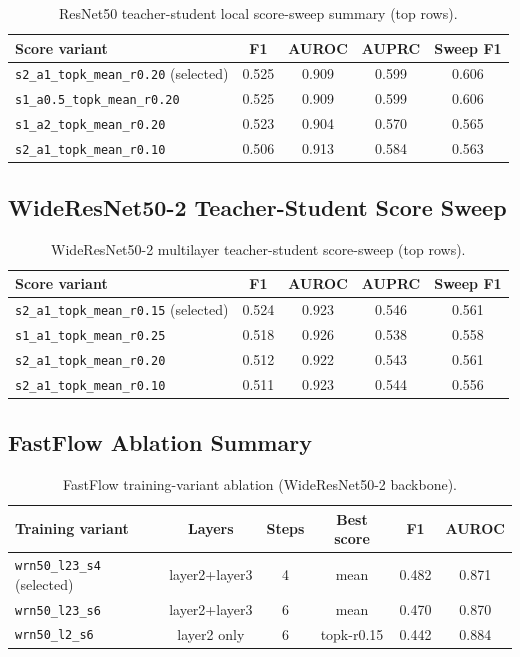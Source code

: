 \documentclass[11pt]{article}
\begin{document}
\begin{table}[H]
\centering
\caption{ResNet50 teacher-student local score-sweep summary (top rows).}
\label{tab:appendix_ts_resnet50}
\begin{tabular}{lcccc}
\toprule
Score variant & F1 & AUROC & AUPRC & Sweep F1 \\
\midrule
\texttt{s2\_a1\_topk\_mean\_r0.20} (selected) & 0.525 & 0.909 & 0.599 & 0.606 \\
\texttt{s1\_a0.5\_topk\_mean\_r0.20}           & 0.525 & 0.909 & 0.599 & 0.606 \\
\texttt{s1\_a2\_topk\_mean\_r0.20}             & 0.523 & 0.904 & 0.570 & 0.565 \\
\texttt{s2\_a1\_topk\_mean\_r0.10}             & 0.506 & 0.913 & 0.584 & 0.563 \\
\bottomrule
\end{tabular}
\end{table}

\subsection{WideResNet50-2 Teacher-Student Score Sweep}

\begin{table}[H]
\centering
\caption{WideResNet50-2 multilayer teacher-student score-sweep (top rows).}
\label{tab:appendix_ts_wrn}
\begin{tabular}{lcccc}
\toprule
Score variant & F1 & AUROC & AUPRC & Sweep F1 \\
\midrule
\texttt{s2\_a1\_topk\_mean\_r0.15} (selected) & 0.524 & 0.923 & 0.546 & 0.561 \\
\texttt{s1\_a1\_topk\_mean\_r0.25}             & 0.518 & 0.926 & 0.538 & 0.558 \\
\texttt{s2\_a1\_topk\_mean\_r0.20}             & 0.512 & 0.922 & 0.543 & 0.561 \\
\texttt{s2\_a1\_topk\_mean\_r0.10}             & 0.511 & 0.923 & 0.544 & 0.556 \\
\bottomrule
\end{tabular}
\end{table}

\subsection{FastFlow Ablation Summary}

\begin{table}[H]
\centering
\caption{FastFlow training-variant ablation (WideResNet50-2 backbone).}
\label{tab:appendix_fastflow}
\begin{tabular}{lccccc}
\toprule
Training variant & Layers & Steps & Best score & F1 & AUROC \\
\midrule
\texttt{wrn50\_l23\_s4} (selected) & layer2+layer3 & 4 & mean       & 0.482 & 0.871 \\
\texttt{wrn50\_l23\_s6}            & layer2+layer3 & 6 & mean       & 0.470 & 0.870 \\
\texttt{wrn50\_l2\_s6}             & layer2 only   & 6 & topk-r0.15 & 0.442 & 0.884 \\
\bottomrule
\end{tabular}
\end{table}
\end{document}
